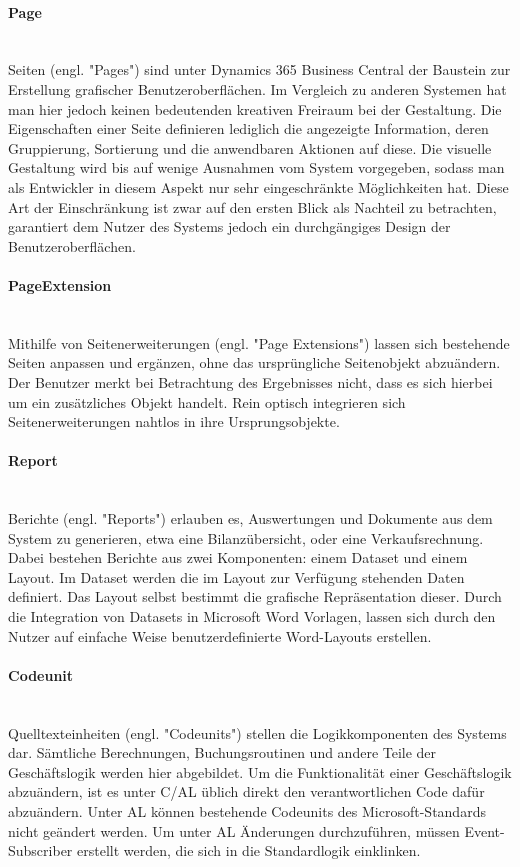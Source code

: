 \paragraph{Page}\mbox{}\\
Seiten (engl. "Pages") sind unter Dynamics 365 Business Central der Baustein zur Erstellung grafischer Benutzeroberflächen. Im Vergleich zu anderen Systemen hat man hier jedoch keinen bedeutenden kreativen Freiraum bei der Gestaltung. Die Eigenschaften einer Seite definieren lediglich die angezeigte Information, deren Gruppierung, Sortierung und die anwendbaren Aktionen auf diese. Die visuelle Gestaltung wird bis auf wenige Ausnahmen vom System vorgegeben, sodass man als Entwickler in diesem Aspekt nur sehr eingeschränkte Möglichkeiten hat. Diese Art der Einschränkung ist zwar auf den ersten Blick als Nachteil zu betrachten, garantiert dem Nutzer des Systems jedoch ein durchgängiges Design der Benutzeroberflächen.

\paragraph{PageExtension}\mbox{}\\
Mithilfe von Seitenerweiterungen (engl. "Page Extensions") lassen sich bestehende Seiten anpassen und ergänzen, ohne das ursprüngliche Seitenobjekt abzuändern. Der Benutzer merkt bei Betrachtung des Ergebnisses nicht, dass es sich hierbei um ein zusätzliches Objekt handelt. Rein optisch integrieren sich Seitenerweiterungen nahtlos in ihre Ursprungsobjekte.

\paragraph{Report}\mbox{}\\
Berichte (engl. "Reports") erlauben es, Auswertungen und Dokumente aus dem System zu generieren, etwa eine Bilanzübersicht, oder eine Verkaufsrechnung. Dabei bestehen Berichte aus zwei Komponenten: einem Dataset und einem Layout. Im Dataset werden die im Layout zur Verfügung stehenden Daten definiert. Das Layout selbst bestimmt die grafische Repräsentation dieser. Durch die Integration von Datasets in Microsoft Word Vorlagen, lassen sich durch den Nutzer auf einfache Weise benutzerdefinierte Word-Layouts erstellen.

\paragraph{Codeunit}\mbox{}\\
Quelltexteinheiten (engl. "Codeunits") stellen die Logikkomponenten des Systems dar. Sämtliche Berechnungen, Buchungsroutinen und andere Teile der Geschäftslogik werden hier abgebildet. Um die Funktionalität einer Geschäftslogik abzuändern, ist es unter C/AL üblich direkt den verantwortlichen Code dafür abzuändern. Unter AL können bestehende Codeunits des Microsoft-Standards nicht geändert werden. Um unter AL Änderungen durchzuführen, müssen Event-Subscriber erstellt werden, die sich in die Standardlogik einklinken. 

